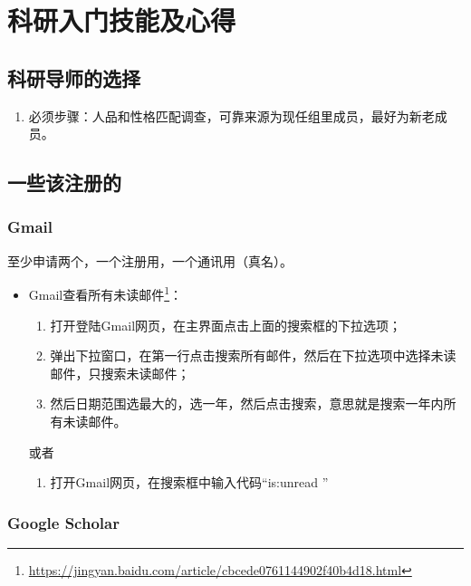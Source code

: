 



\chapter{科研入门技能及心得}
\section{科研导师的选择}
\begin{enumerate}
\item 必须步骤：人品和性格匹配调查，可靠来源为现任组里成员，最好为新老成员。
\end{enumerate}



\section{一些该注册的}
\subsection{Gmail}
 至少申请两个，一个注册用，一个通讯用（真名）。

\begin{itemize}
\item Gmail查看所有未读邮件\footnote{\url{https://jingyan.baidu.com/article/cbcede0761144902f40b4d18.html}}：
\begin{enumerate}
\item 打开登陆Gmail网页，在主界面点击上面的搜索框的下拉选项；
\item 弹出下拉窗口，在第一行点击搜索所有邮件，然后在下拉选项中选择未读邮件，只搜索未读邮件；
\item 然后日期范围选最大的，选一年，然后点击搜索，意思就是搜索一年内所有未读邮件。
\end{enumerate}
或者
\begin{enumerate}
\item 打开Gmail网页，在搜索框中输入代码“is:unread ”
\end{enumerate}
\end{itemize}



\subsection{Google Scholar}



